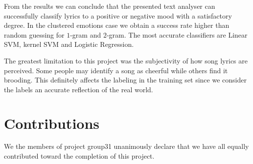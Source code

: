 \documentclass[a4paper,12pt]{article}
\begin{document}
From the results we can conclude that the presented text analyser can successfully classify lyrics to a positive or negative mood with a satisfactory degree. In the clustered emotions case we obtain a success rate higher than random guessing for $1$-gram and $2$-gram. The most accurate classifiers are Linear SVM, kernel SVM and Logistic Regression. 

The greatest limitation to this project was the subjectivity of how song lyrics are perceived. Some people may identify a song as cheerful while others find it brooding. This definitely affects the labeling in the training set since we consider the labels an accurate reflection of the real world. 


\section{Contributions}
\label{sec:contributions}
We the members of project group31 unanimously declare that 
we have all equally contributed toward the completion of this
project. 




\end{document}
